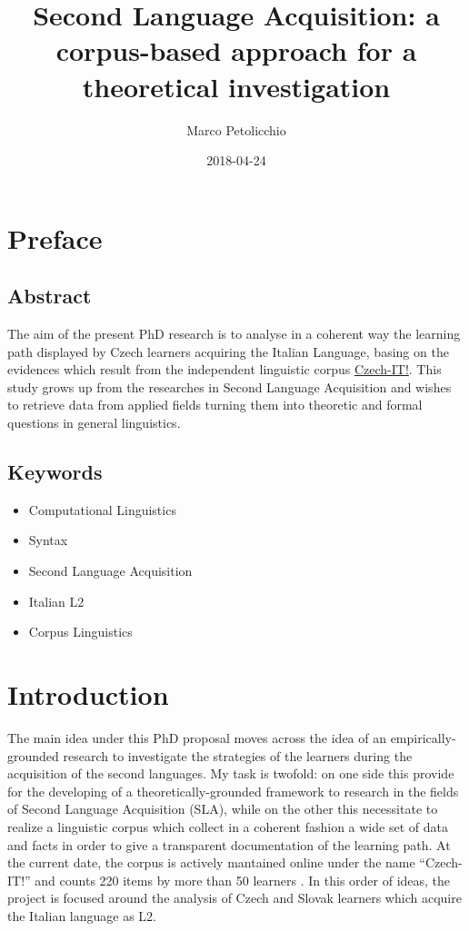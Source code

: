 \documentclass[a4paper,twoside,11pt,chapterprefix=true,listof=totocnumbered,bibliography=totocnumbered]{scrbook}
\title{Second Language Acquisition: a corpus-based approach for a theoretical
investigation}
\author{Marco Petolicchio}
\date{2018-04-24}
\providecommand{\tightlist}{%
  \setlength{\itemsep}{0pt}\setlength{\parskip}{0pt}}
\theoremstyle{definition}
\theoremstyle{definition}
\theoremstyle{definition}
\theoremstyle{remark}
\begin{document}
\maketitle



{
\setcounter{tocdepth}{1}
\tableofcontents
}
\chapter{Preface}\label{preface}

\section{Abstract}\label{abstract}

The aim of the present PhD research is to analyse in a coherent way the
learning path displayed by Czech learners acquiring the Italian
Language, basing on the evidences which result from the independent
linguistic corpus \href{http://czech-it.github.io}{Czech-IT!}. This
study grows up from the researches in Second Language Acquisition and
wishes to retrieve data from applied fields turning them into theoretic
and formal questions in general linguistics.

\section{Keywords}\label{keywords}

\begin{itemize}
\tightlist
\item
  Computational Linguistics
\item
  Syntax
\item
  Second Language Acquisition
\item
  Italian L2
\item
  Corpus Linguistics
\end{itemize}

\chapter{Introduction}\label{introduction}

The main idea under this PhD proposal moves across the idea of an
empirically-grounded research to investigate the strategies of the
learners during the acquisition of the second languages. My task is
twofold: on one side this provide for the developing of a
theoretically-grounded framework to research in the fields of Second
Language Acquisition (SLA), while on the other this necessitate to
realize a linguistic corpus which collect in a coherent fashion a wide
set of data and facts in order to give a transparent documentation of
the learning path. At the current date, the corpus is actively mantained
online under the name \enquote{Czech-IT!} and counts 220 items by more
than 50 learners \citep{czech-it}. In this order of ideas, the project
is focused around the analysis of Czech and Slovak learners which
acquire the Italian language as L2.
\end{document}
